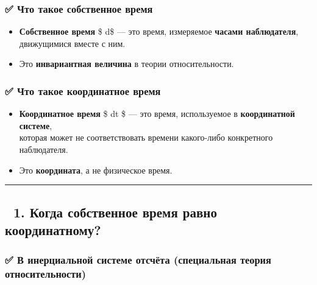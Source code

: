 \documentclass[11pt]{article}
\providecommand{\tightlist}{%
      \setlength{\itemsep}{0pt}\setlength{\parskip}{0pt}}
\begin{document}
\subsubsection{✅ Что такое собственное
время}\label{ux447ux442ux43e-ux442ux430ux43aux43eux435-ux441ux43eux431ux441ux442ux432ux435ux43dux43dux43eux435-ux432ux440ux435ux43cux44f}

\begin{itemize}
\tightlist
\item
  \textbf{Собственное время} \$ d\tau \$ --- это время, измеряемое
  \textbf{часами наблюдателя},\\
  движущимися вместе с ним.
\item
  Это \textbf{инвариантная величина} в теории относительности.
\end{itemize}

\subsubsection{✅ Что такое координатное
время}\label{ux447ux442ux43e-ux442ux430ux43aux43eux435-ux43aux43eux43eux440ux434ux438ux43dux430ux442ux43dux43eux435-ux432ux440ux435ux43cux44f}

\begin{itemize}
\tightlist
\item
  \textbf{Координатное время} \$ dt \$ --- это время, используемое в
  \textbf{координатной системе},\\
  которая может не соответствовать времени какого-либо конкретного
  наблюдателя.
\item
  Это \textbf{координата}, а не физическое время.
\end{itemize}

\begin{center}\rule{0.5\linewidth}{\linethickness}\end{center}

\subsection{🔹 1. Когда собственное время равно
координатному?}\label{ux43aux43eux433ux434ux430-ux441ux43eux431ux441ux442ux432ux435ux43dux43dux43eux435-ux432ux440ux435ux43cux44f-ux440ux430ux432ux43dux43e-ux43aux43eux43eux440ux434ux438ux43dux430ux442ux43dux43eux43cux443}

\subsubsection{✅ В инерциальной системе отсчёта (специальная теория
относительности)}\label{ux432-ux438ux43dux435ux440ux446ux438ux430ux43bux44cux43dux43eux439-ux441ux438ux441ux442ux435ux43cux435-ux43eux442ux441ux447ux451ux442ux430-ux441ux43fux435ux446ux438ux430ux43bux44cux43dux430ux44f-ux442ux435ux43eux440ux438ux44f-ux43eux442ux43dux43eux441ux438ux442ux435ux43bux44cux43dux43eux441ux442ux438}
\end{document}
